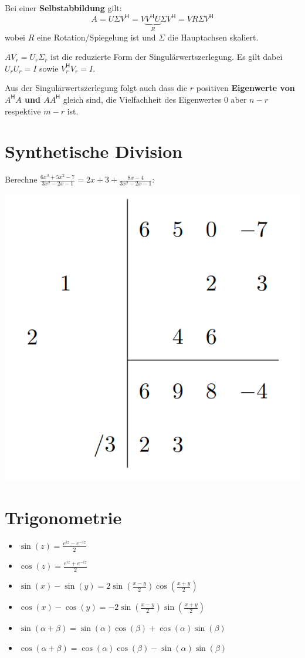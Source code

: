 \documentclass[a4paper,10pt]{article}
\newcommand*{\hermconj}{\mathsf{H}}
\begin{document}
Bei einer \textbf{Selbstabbildung} gilt:
$$A = U \Sigma V^\hermconj = V \underbrace{V^\hermconj U}_R \Sigma V^\hermconj = V R \Sigma V^\hermconj$$
wobei $R$ eine Rotation/Spiegelung ist und $\Sigma$ die Hauptachsen skaliert.

$A V_r = U_r \Sigma_r$ ist die reduzierte Form der Singulärwertszerlegung. Es gilt dabei $U_r U_r = I$ sowie $V_r^\hermconj V_r = I$.

Aus der Singulärwertszerlegung folgt auch dass die $r$ positiven \textbf{Eigenwerte von $A^\hermconj A$ und $AA^\hermconj$} gleich sind, die Vielfachheit des Eigenwertes $0$ aber $n-r$ respektive $m-r$ ist.

\section{Synthetische Division}
Berechne $\frac{6x^3 + 5x^2 - 7}{3x^2 - 2x - 1} = 2x + 3 + \frac{8x - 4}{3x^2 -2x - 1}$:\\
\begin{center}
  \includegraphics[width=0.4 \linewidth]{synthetic-division.png}
\end{center}

\section{Trigonometrie}

\begin{itemize}
  \item $\sin(z) = \frac{e^{iz} - e^{-iz}}{2}$
  \item $\cos(z) = \frac{e^{iz} + e^{-iz}}{2}$
  \item $\sin(x) - \sin(y) = 2\sin(\frac{x - y}{2})\cos(\frac{x + y}{2})$
  \item $\cos(x) - \cos(y) = -2\sin(\frac{x - y}{2})\sin(\frac{x + y}{2})$
  \item $\sin(\alpha + \beta) = \sin(\alpha) \cos(\beta) + \cos(\alpha) \sin(\beta)$
  \item $\cos(\alpha + \beta) = \cos(\alpha) \cos(\beta) - \sin(\alpha) \sin(\beta)$
\end{itemize}
\end{document}

